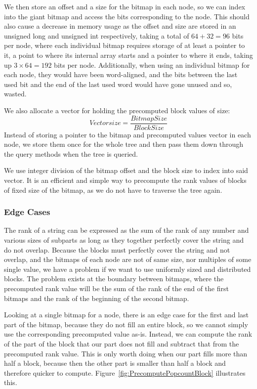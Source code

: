 We then store an offset and a size for the bitmap in each node, so we can index into the giant bitmap and access the bits corresponding to the node.
This should also cause a decrease in memory usage as the offset and size are stored in an unsigned long and unsigned int respectively, taking a total of $64+32=96$ bits per node, where each individual bitmap requires storage of at least a pointer to it, a point to where its internal array starts and a pointer to where it ends, taking up $3 \times 64=192$ bits per node.
Additionally, when using an individual bitmap for each node, they would have been word-aligned, and the bits between the last used bit and the end of the last used word would have gone unused and so, wasted.

We also allocate a vector for holding the precomputed block values of size:
\[Vector size = \frac{BitmapSize}{BlockSize} \]
Instead of storing a pointer to the bitmap and precomputed values vector in each node, we store them once for the whole tree and then pass them down through the query methods when the tree is queried.

We use integer division of the bitmap offset and the block size to index into said vector. It is an efficient and simple way to precompute the rank values of blocks of fixed size of the bitmap, as we do not have to traverse the tree again.


\subsubsection{Edge Cases}
\label{sec:rankQueriesWithPrecomputedRanksEdgeCases}
The rank of a string can be expressed as the sum of the rank of any number and various sizes of subparts as long as they together perfectly cover the string and do not overlap.
Because the blocks must perfectly cover the string and not overlap, and the bitmaps of each node are not of same size, nor multiples of some single value, we have a problem if we want to use uniformly sized and distributed blocks.
The problem exists at the boundary between bitmaps, where the precomputed rank value will be the sum of the rank of the end of the first bitmaps and the rank of the beginning of the second bitmap.

Looking at a single bitmap for a node, there is an edge case for the first and last part of the bitmap, because they do not fill an entire block, so we cannot simply use the corresponding precomputed value as-is.
Instead, we can compute the rank of the part of the block that our part does not fill and subtract that from the precomputed rank value.
This is only worth doing when our part fills more than half a block, because then the other part is smaller than half a block and therefore quicker to compute.
Figure~\ref{fig:PrecomputePopcountBlock} illustrates this.




